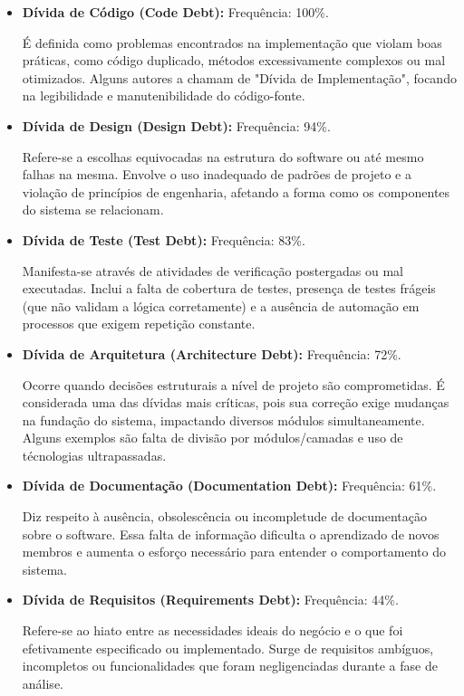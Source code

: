 \documentclass[12pt,openright,oneside,a4paper,brazil]{abntex2}
\begin{document}
\begin{itemize}
    \item \textbf{Dívida de Código (Code Debt):} Frequência: 100\%.

    É definida como problemas encontrados na implementação que violam boas práticas, como código duplicado, métodos excessivamente complexos ou mal otimizados. Alguns autores a chamam de "Dívida de Implementação", focando na legibilidade e manutenibilidade do código-fonte.

    \item \textbf{Dívida de Design (Design Debt):} Frequência: 94\%.

    Refere-se a escolhas equivocadas na estrutura do software ou até mesmo falhas na mesma. Envolve o uso inadequado de padrões de projeto e a violação de princípios de engenharia, afetando a forma como os componentes do sistema se relacionam.

    \item \textbf{Dívida de Teste (Test Debt):} Frequência: 83\%.

    Manifesta-se através de atividades de verificação postergadas ou mal executadas. Inclui a falta de cobertura de testes, presença de testes frágeis (que não validam a lógica corretamente) e a ausência de automação em processos que exigem repetição constante.

    \item \textbf{Dívida de Arquitetura (Architecture Debt):} Frequência: 72\%.

    Ocorre quando decisões estruturais a nível de projeto são comprometidas. É considerada uma das dívidas mais críticas, pois sua correção exige mudanças na fundação do sistema, impactando diversos módulos simultaneamente. Alguns exemplos são falta de divisão por módulos/camadas e uso de técnologias ultrapassadas.

    \item \textbf{Dívida de Documentação (Documentation Debt):} Frequência: 61\%.

    Diz respeito à ausência, obsolescência ou incompletude de documentação sobre o software. Essa falta de informação dificulta o aprendizado de novos membros e aumenta o esforço necessário para entender o comportamento do sistema.

    \item \textbf{Dívida de Requisitos (Requirements Debt):} Frequência: 44\%.

    Refere-se ao hiato entre as necessidades ideais do negócio e o que foi efetivamente especificado ou implementado. Surge de requisitos ambíguos, incompletos ou funcionalidades que foram negligenciadas durante a fase de análise.


\end{itemize}
\end{document}
